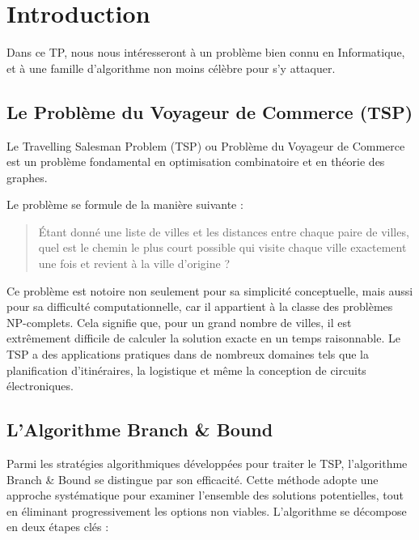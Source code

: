 
\section*{Introduction}\label{introduction}

Dans ce TP, nous nous intéresseront à un problème bien connu en Informatique, et à une famille d'algorithme non moins célèbre pour s'y attaquer.

\subsection{Le Problème du Voyageur de Commerce
(TSP)}\label{le-probluxe8me-du-voyageur-de-commerce-tsp}

Le Travelling Salesman Problem (TSP) ou Problème du Voyageur de Commerce est un problème fondamental en optimisation combinatoire et en théorie des graphes.

Le problème se formule de la manière suivante :

\begin{quote}
Étant donné une liste de villes et les distances entre chaque paire de villes, quel est le chemin le plus court possible qui visite chaque ville exactement une fois et revient à la ville d'origine ?
\end{quote}

Ce problème est notoire non seulement pour sa simplicité conceptuelle, mais aussi pour sa difficulté computationnelle, car il appartient à la classe des problèmes NP-complets. Cela signifie que, pour un grand nombre de villes, il est extrêmement difficile de calculer la solution exacte en un temps raisonnable. Le TSP a des applications pratiques dans de nombreux domaines tels que la planification d'itinéraires, la logistique et même la conception de circuits électroniques.

\subsection{L'Algorithme Branch \&
Bound}\label{lalgorithme-branch-bound}

Parmi les stratégies algorithmiques développées pour traiter le TSP, l'algorithme Branch \& Bound se distingue par son efficacité. Cette méthode adopte une approche systématique pour examiner l'ensemble des solutions potentielles, tout en éliminant progressivement les options non viables. L'algorithme se décompose en deux étapes clés :

